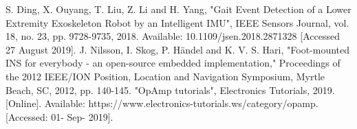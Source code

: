 \documentclass[12 pt, a4paper]{thesis}
\begin{document}
\begin{thebibliography}{99}
S. Ding, X. Ouyang, T. Liu, Z. Li and H. Yang, "Gait Event Detection of a Lower Extremity Exoskeleton Robot by an Intelligent IMU", IEEE Sensors Journal, vol. 18, no. 23, pp. 9728-9735, 2018. Available: 10.1109/jsen.2018.2871328 [Accessed 27 August 2019].
J. Nilsson, I. Skog, P. Händel and K. V. S. Hari, "Foot-mounted INS for everybody - an open-source embedded implementation," Proceedings of the 2012 IEEE/ION Position, Location and Navigation Symposium, Myrtle Beach, SC, 2012, pp. 140-145.
"OpAmp tutorials", Electronics Tutorials, 2019. [Online]. Available: https://www.electronics-tutorials.ws/category/opamp. [Accessed: 01- Sep- 2019].
\end{thebibliography}
\end{document}
